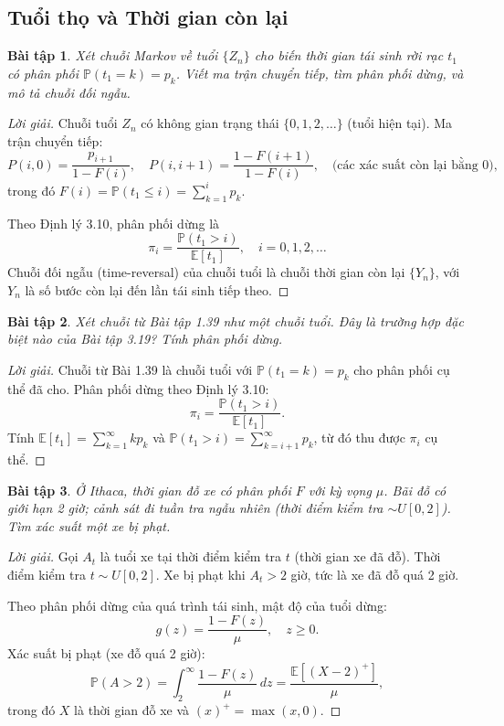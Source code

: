\documentclass[8pt,a4paper]{article}
\newtheorem{exercise}{Bài tập}
\newenvironment{solution}{\begin{proof}[Lời giải]}{\end{proof}}
\newcommand{\prob}{\mathbb{P}}
\newcommand{\E}{\mathbb{E}}
\begin{document}
\subsection*{Tuổi thọ và Thời gian còn lại}

\begin{exercise}
Xét chuỗi Markov về tuổi $\{Z_n\}$ cho biến thời gian tái sinh rời rạc $t_1$ có phân phối $\prob(t_1 = k) = p_k$. Viết ma trận chuyển tiếp, tìm phân phối dừng, và mô tả chuỗi đối ngẫu.
\end{exercise}
\begin{solution}
Chuỗi tuổi $Z_n$ có không gian trạng thái $\{0, 1, 2, \ldots\}$ (tuổi hiện tại). Ma trận chuyển tiếp:
\[
  P(i, 0) = \frac{p_{i+1}}{1 - F(i)}, \quad P(i, i+1) = \frac{1 - F(i+1)}{1 - F(i)}, \quad \text{(các xác suất còn lại bằng 0)},
\]
trong đó $F(i) = \prob(t_1 \leq i) = \sum_{k=1}^i p_k$.

Theo Định lý 3.10, phân phối dừng là
\[
  \pi_i = \frac{\prob(t_1 > i)}{\E[t_1]}, \quad i = 0, 1, 2, \ldots
\]
Chuỗi đối ngẫu (time-reversal) của chuỗi tuổi là chuỗi thời gian còn lại $\{Y_n\}$, với $Y_n$ là số bước còn lại đến lần tái sinh tiếp theo.
\end{solution}

\begin{exercise}
Xét chuỗi từ Bài tập 1.39 như một chuỗi tuổi. Đây là trường hợp đặc biệt nào của Bài tập 3.19? Tính phân phối dừng.
\end{exercise}
\begin{solution}
Chuỗi từ Bài 1.39 là chuỗi tuổi với $\prob(t_1 = k) = p_k$ cho phân phối cụ thể đã cho. Phân phối dừng theo Định lý 3.10:
\[
  \pi_i = \frac{\prob(t_1 > i)}{\E[t_1]}.
\]
Tính $\E[t_1] = \sum_{k=1}^\infty k p_k$ và $\prob(t_1 > i) = \sum_{k=i+1}^\infty p_k$, từ đó thu được $\pi_i$ cụ thể.
\end{solution}

\begin{exercise}
Ở Ithaca, thời gian đỗ xe có phân phối $F$ với kỳ vọng $\mu$. Bãi đỗ có giới hạn 2 giờ; cảnh sát đi tuần tra ngẫu nhiên (thời điểm kiểm tra $\sim U[0,2]$). Tìm xác suất một xe bị phạt.
\end{exercise}
\begin{solution}
Gọi $A_t$ là tuổi xe tại thời điểm kiểm tra $t$ (thời gian xe đã đỗ). Thời điểm kiểm tra $t \sim U[0,2]$. Xe bị phạt khi $A_t > 2$ giờ, tức là xe đã đỗ quá 2 giờ.

Theo phân phối dừng của quá trình tái sinh, mật độ của tuổi dừng:
\[
  g(z) = \frac{1 - F(z)}{\mu}, \quad z \geq 0.
\]
Xác suất bị phạt (xe đỗ quá 2 giờ):
\[
  \prob(A > 2) = \int_2^\infty \frac{1-F(z)}{\mu}\,dz = \frac{\E[(X-2)^+]}{\mu},
\]
trong đó $X$ là thời gian đỗ xe và $(x)^+ = \max(x,0)$.
\end{solution}
\end{document}
